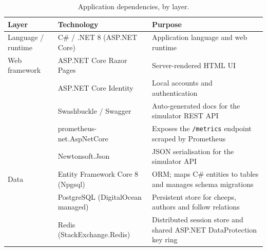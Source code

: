 {%
\begin{table}[H]
    \centering
    \caption{Application dependencies, by layer.}
    \label{tab:dependencies-app}
    \small
    \begin{tabularx}{\linewidth}{l l X}
        \toprule
        \textbf{Layer} & \textbf{Technology} & \textbf{Purpose} \\
        \midrule
        Language / runtime & C\# / .NET 8 (ASP.NET Core) & Application language and web runtime \\
        \midrule
        Web framework & ASP.NET Core Razor Pages & Server-rendered HTML UI \\
            & ASP.NET Core Identity & Local accounts and authentication \\
            & Swashbuckle / Swagger & Auto-generated docs for the simulator REST API \\
            & prometheus-net.AspNetCore & Exposes the \texttt{/metrics} endpoint scraped by Prometheus \\
            & Newtonsoft.Json & JSON serialisation for the simulator API \\
        \midrule
        Data & Entity Framework Core 8 (Npgsql) & ORM; maps C\# entities to tables and manages schema migrations \\
            & PostgreSQL (DigitalOcean managed) & Persistent store for cheeps, authors and follow relations \\
            & Redis (StackExchange.Redis) & Distributed session store and shared ASP.NET DataProtection key ring \\
        \bottomrule
    \end{tabularx}
\end{table}

}
